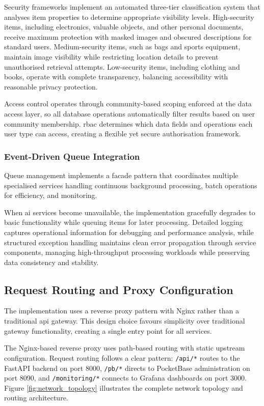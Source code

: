 Security frameworks implement an automated three-tier classification system that analyses item properties to determine appropriate visibility levels. High-security items, including electronics, valuable objects, and other personal documents, receive maximum protection with masked images and obscured descriptions for standard users. Medium-security items, such as bags and sports equipment, maintain image visibility while restricting location details to prevent unauthorised retrieval attempts. Low-security items, including clothing and books, operate with complete transparency, balancing accessibility with reasonable privacy protection.

Access control operates through community-based scoping enforced at the data access layer, so all database operations automatically filter results based on user community membership. \ac{rbac} determines which data fields and operations each user type can access, creating a flexible yet secure authorisation framework.

\subsubsection{Event-Driven Queue Integration}

Queue management implements a facade pattern that coordinates multiple specialised services handling continuous background processing, batch operations for efficiency, and monitoring.

When \ac{ai} services become unavailable, the implementation gracefully degrades to basic functionality while queuing items for later processing. Detailed logging captures operational information for debugging and performance analysis, while structured exception handling maintains clean error propagation through service components, managing high-throughput processing workloads while preserving data consistency and stability.

\subsection{Request Routing and Proxy Configuration} \label{subsection:reverse_proxy_gateway}

The implementation uses a reverse proxy pattern with Nginx rather than a traditional \ac{api} gateway. This design choice favours simplicity over traditional gateway functionality, creating a single entry point for all services.

The Nginx-based reverse proxy uses path-based routing with static upstream configuration. Request routing follows a clear pattern: \texttt{/api/*} routes to the FastAPI backend on port 8000, \texttt{/pb/*} directs to PocketBase administration on port 8090, and \texttt{/monitoring/*} connects to Grafana dashboards on port 3000. Figure \ref{fig:network_topology} illustrates the complete network topology and routing architecture.


